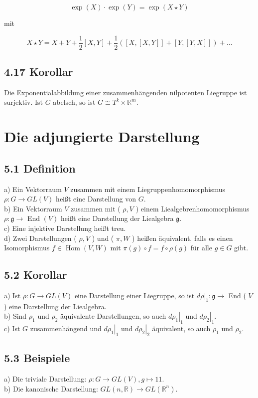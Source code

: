 \documentclass[10pt, letterpaper]{article}
\begin{document}
$$
\exp (X) \cdot \exp (Y)=\exp (X \star Y)
$$

mit

$$
X \star Y=X+Y+\frac{1}{2}[X, Y]+\frac{1}{2}([X,[X, Y]]+[Y,[Y, X]])+\ldots
$$

\subsection*{4.17 Korollar}
Die Exponentialabbildung einer zusammenhängenden nilpotenten Liegruppe ist surjektiv. Ist $G$ abelsch, so ist $G \cong T^{k} \times \mathbb{R}^{m}$.

\section{Die adjungierte Darstellung}


\subsection*{5.1 Definition}
a) Ein Vektorraum $V$ zusammen mit einem Liegruppenhomomorphismus $\rho: G \rightarrow G L(V)$ heißt eine Darstellung von $G$.\\
b) Ein Vektorraum $V$ zusammen mit ( $\rho, V$ ) einem Liealgebrenhomomorphismus $\rho: \mathfrak{g} \rightarrow$ End $(V)$ heißt eine Darstellung der Liealgebra $\mathfrak{g}$.\\
c) Eine injektive Darstellung heißt treu.\\
d) Zwei Darstellungen ( $\rho, V$ ) und ( $\pi, W$ ) heißen äquivalent, falls es einen Isomorphismus $f \in \operatorname{Hom}(V, W)$ mit $\pi(g) \circ f=f \circ \rho(g)$ für alle $g \in G$ gibt.

\subsection*{5.2 Korollar}
a) Ist $\rho: G \rightarrow G L(V)$ eine Darstellung einer Liegruppe, so ist $\left.d \rho\right|_{1}: \mathfrak{g} \rightarrow$ End ( $V$ ) eine Darstellung der Liealgebra.\\
b) Sind $\rho_{1}$ und $\rho_{2}$ äquivalente Darstellungen, so auch $\left.d \rho_{1}\right|_{1}$ und $\left.d \rho_{2}\right|_{1}$.\\
c) Ist $G$ zusammenhängend und $\left.d \rho_{1}\right|_{1}$ und $\left.d \rho_{2}\right|_{2}$ äquivalent, so auch $\rho_{1}$ und $\rho_{2}$.

\subsection*{5.3 Beispiele}
a) Die triviale Darstellung: $\rho: G \rightarrow G L(V), g \mapsto 11$.\\
b) Die kanonische Darstellung: $G L(n, \mathbb{R}) \rightarrow G L\left(\mathbb{R}^{n}\right)$.
\end{document}
